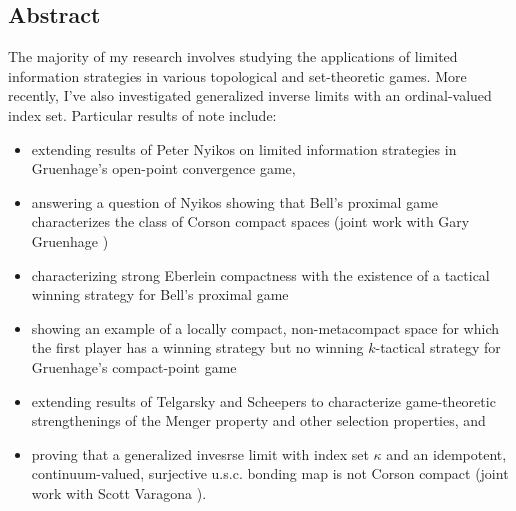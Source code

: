 \documentclass[11pt]{amsart}
\theoremstyle{plain}
\newcommand{\<}{\langle}
\renewcommand{\>}{\rangle}
\newcommand{\term}{\textit}
\begin{document}
\subsection*{Abstract}

The majority of my research involves studying the applications of
limited information strategies in various topological and set-theoretic
games. More recently,
I've also investigated generalized inverse limits with an ordinal-valued
index set. Particular results of note include:
  \begin{itemize}
    \item extending results of Peter Nyikos \cite{MR1031771} on limited
          information strategies in Gruenhage's open-point convergence game,
    \item answering a question of Nyikos \cite{nyikosProximalPreprint} showing
          that Bell's proximal game characterizes the class of Corson compact
          spaces (joint work with Gary Gruenhage \cite{MR3227201})
    \item characterizing strong Eberlein compactness with the existence of
          a tactical winning strategy for Bell's proximal game
          \cite{tacticProximal}
    \item showing an example of a locally compact, non-metacompact space for
          which the first player has a winning strategy but no winning
          $k$-tactical strategy for Gruenhage's compact-point game
          \cite{ktacticsCompactOpen}
    \item extending results of Telgarsky \cite{MR753073} and Scheepers
          \cite{MR1273523} to characterize
          game-theoretic strengthenings of the Menger property and other
          selection properties, and
    \item proving that a generalized invesrse limit with index set \(\kappa\)
          and an idempotent, continuum-valued, surjective u.s.c. bonding map
          is not Corson compact (joint work with Scott Varagona
          \cite{destroyMetrizability}).
  \end{itemize}


\end{document}
